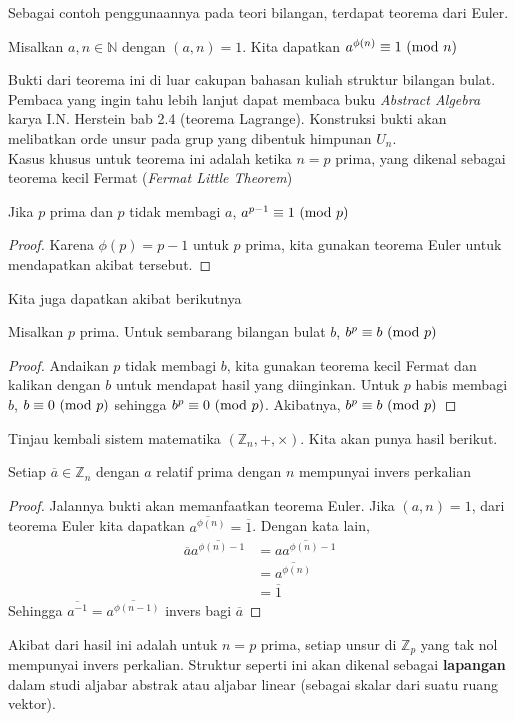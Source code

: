 	Sebagai contoh penggunaannya pada teori bilangan, terdapat teorema dari Euler.
	
	\begin{theorem}
		Misalkan $a,n \in \mathbb{N}$ dengan $(a,n) = 1$. Kita dapatkan $a^{\phi(n)} \equiv 1 \ (\textnormal{mod } n)$
	\end{theorem}
	Bukti dari teorema ini di luar cakupan bahasan kuliah struktur bilangan bulat. Pembaca yang ingin tahu lebih lanjut dapat membaca buku \textit{Abstract Algebra} karya I.N. Herstein bab 2.4 (teorema Lagrange). Konstruksi bukti akan melibatkan orde unsur pada grup yang dibentuk himpunan $U_n$.
	\\
	
	Kasus khusus untuk teorema ini adalah ketika $n = p$ prima, yang dikenal sebagai teorema kecil Fermat (\textit{Fermat Little Theorem})
	
	\begin{corollary}
		Jika $p$ prima dan $p$ tidak membagi $a$, $a^{p-1} \equiv 1 \ (\textnormal{mod } p)$ 
	\end{corollary}
	\begin{proof}
		Karena $\phi(p) = p-1$ untuk $p$ prima, kita gunakan teorema Euler untuk mendapatkan akibat tersebut.
	\end{proof}
	Kita juga dapatkan akibat berikutnya
	
	\begin{corollary}
		Misalkan $p$ prima. Untuk sembarang bilangan bulat $b$, $b^p \equiv b \ (\textnormal{mod } p)$
	\end{corollary}
	\begin{proof}
		Andaikan $p$ tidak membagi $b$, kita gunakan teorema kecil Fermat dan kalikan dengan $b$ untuk mendapat hasil yang diinginkan. Untuk $p$ habis membagi $b$, $b \equiv 0 \ (\textnormal{mod }p)$ sehingga $b^p \equiv 0 \ (\textnormal{mod }p)$. Akibatnya, $b^p \equiv b \ (\textnormal{mod }p)$
	\end{proof}

	Tinjau kembali sistem matematika $(\mathbb{Z}_n, +, \times)$. Kita akan punya hasil berikut.
	
	\begin{theorem}
		Setiap $\overline{a} \in \mathbb{Z}_n$ dengan $a$ relatif prima dengan $n$ mempunyai invers perkalian
	\end{theorem}
	\begin{proof}
	Jalannya bukti akan memanfaatkan teorema Euler. Jika $(a,n) = 1$, dari teorema Euler kita dapatkan $\overline{a^{\phi{(n)}}} = \overline{1}$. Dengan kata lain, 
	\begin{equation*}
	\begin{split}
		\overline{a}\overline{a^{\phi(n)-1}} & = \overline{a a^{\phi(n)-1}}\\
		& = \overline{a^{\phi(n)}} \\
		& = \overline{1}	 
	\end{split}
	\end{equation*}
	Sehingga $\overline{a^{-1}} = \overline{a^{\phi(n-1)}}$ invers bagi $\overline{a}$
	\end{proof}
	
	Akibat dari hasil ini adalah untuk $n = p$ prima, setiap unsur di $\mathbb{Z}_p$ yang tak nol mempunyai invers perkalian. Struktur seperti ini akan dikenal sebagai \textbf{lapangan} dalam studi aljabar abstrak atau aljabar linear (sebagai skalar dari suatu ruang vektor).
	